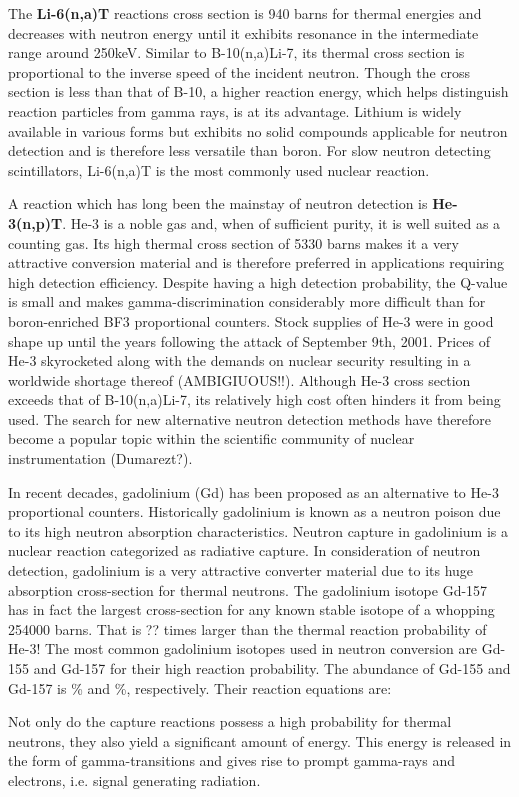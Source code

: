The {\bf Li-6(n,a)T} reactions cross section is 940 barns for thermal energies and decreases with neutron energy until it exhibits resonance in the intermediate range around 250keV.  Similar to B-10(n,a)Li-7, its thermal cross section is proportional to the inverse speed of the incident neutron.
Though the cross section is less than that of B-10, a higher reaction energy, which helps distinguish reaction particles from gamma rays, is at its advantage.
Lithium is widely available in various forms but exhibits no solid compounds applicable for neutron detection and is therefore less versatile than boron. For slow neutron detecting scintillators, Li-6(n,a)T is the most commonly used nuclear reaction. \newline

A reaction which has long been the mainstay of neutron detection is {\bf He-3(n,p)T}.
He-3 is a noble gas and, when of sufficient purity, it is well suited as a counting gas. Its high thermal cross section of 5330 barns makes it a very attractive conversion material and is therefore preferred in applications requiring high detection efficiency. Despite having a high detection probability, the Q-value is small and makes gamma-discrimination considerably more difficult than for boron-enriched BF3 proportional counters.
Stock supplies of He-3 were in good shape up until the years following the attack of September 9th, 2001. Prices of He-3 skyrocketed along with the demands on nuclear security resulting in a worldwide shortage thereof (AMBIGIUOUS!!). Although He-3 cross section exceeds that of B-10(n,a)Li-7, its relatively high cost often hinders it from being used. The search for new alternative neutron detection methods have therefore become a popular topic within the scientific community of nuclear instrumentation (Dumarezt?). \newline

In recent decades, gadolinium (Gd) has been proposed as an alternative to He-3 proportional counters. Historically gadolinium is known as a neutron poison due to its high neutron absorption characteristics. Neutron capture in gadolinium is a nuclear reaction categorized as radiative capture.
In consideration of neutron detection, gadolinium is a very attractive converter material due to its huge absorption cross-section for thermal neutrons. The gadolinium isotope Gd-157 has in fact the largest cross-section for any known stable isotope of a whopping 254000 barns. That is ?? times larger than the thermal reaction probability of He-3! The most common gadolinium isotopes used in neutron conversion are Gd-155 and Gd-157 for their high reaction probability. The abundance of Gd-155 and Gd-157 is \% and \%, respectively.
Their reaction equations are:

Not only do the capture reactions possess a high probability for thermal neutrons, they also yield a significant amount of energy. This energy is released in the form of gamma-transitions and gives rise to prompt gamma-rays and electrons, i.e. signal generating radiation.



